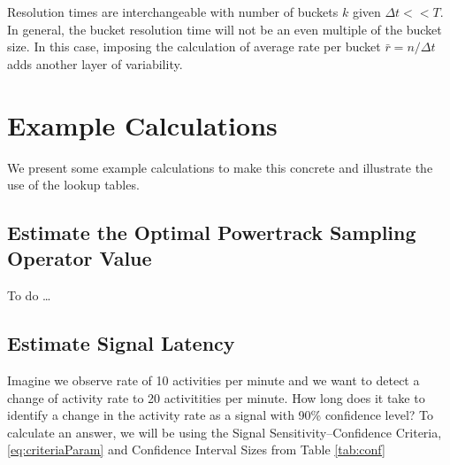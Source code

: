 \documentclass{article}
\begin{document}
Resolution times are interchangeable with number of buckets $k$ given $\Delta t << T$.  In general, the
bucket resolution time will not be an even multiple of the bucket size.  In this case, imposing the calculation of average rate per bucket $\bar{r} = n/\Delta t$ adds another layer of variability.

%
%
%

\section{Example Calculations} 

We present some example calculations to make this concrete and illustrate the use of the lookup tables.

\subsection{Estimate the Optimal Powertrack Sampling Operator Value} 

To do \ldots

\subsection{Estimate Signal Latency} 


Imagine we observe rate of 10 activities per minute and we want to detect a change of activity rate to 20 activitities per minute.  How long does it take to identify a change in the activity rate as a signal with 90\% confidence level? To calculate an answer, we will be using the Signal Sensitivity--Confidence Criteria, \ref{eq:criteriaParam} and Confidence Interval Sizes from Table \ref{tab:conf}
\end{document}
